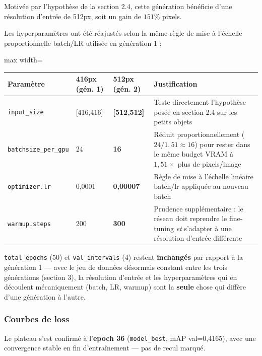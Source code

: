 \documentclass[11pt,a4paper]{article}
\let\Oldsubsubsection\subsubsection
\renewcommand{\subsubsection}{\FloatBarrier\Oldsubsubsection}
\begin{document}
    Motivée par l'hypothèse de la section 2.4, cette génération bénéficie d'une résolution d'entrée de 512px, soit un gain de $151\%$ pixels.
    
    Les hyperparamètres ont été réajustés selon la même règle de mise à
    l'échelle proportionnelle batch/LR utilisée en génération 1 :
    
    \begin{table}[!htbp]
    \centering
    \small
    \begin{adjustbox}{max width=\linewidth}
    \begin{tabular}{@{}p{3.4cm}p{2.2cm}p{2.2cm}p{7.3cm}@{}}
    \toprule
    \textbf{Paramètre} & \textbf{416px (gén. 1)} & \textbf{512px (gén. 2)} & \textbf{Justification} \\
    \midrule
    \texttt{input\_size} & [416,416] & \textbf{[512,512]} & Teste directement l'hypothèse posée en section 2.4 sur les petits objets \\
    \texttt{batchsize\_per\_gpu} & 24 & \textbf{16} & Réduit proportionnellement ($24/1{,}51\approx16$) pour rester dans le même budget VRAM à $1{,}51\times$ plus de pixels/image \\
    \texttt{optimizer.lr} & 0,0001 & \textbf{0,00007} & Règle de mise à l'échelle linéaire batch/lr appliquée au nouveau batch \\
    \texttt{warmup.steps} & 200 & \textbf{300} & Prudence supplémentaire : le réseau doit reprendre le fine-tuning \emph{et} s'adapter à une résolution d'entrée différente \\
    \bottomrule
    \end{tabular}
    \end{adjustbox}
    \end{table}
    
    \texttt{total\_epochs} (50) et \texttt{val\_intervals} (4) restent
    \textbf{inchangés} par rapport à la génération 1 --- avec le jeu de
    données désormais constant entre les trois générations (section 3),
    la résolution d'entrée et les hyperparamètres qui en découlent
    mécaniquement (batch, LR, warmup) sont la \textbf{seule} chose qui
    diffère d'une génération à l'autre.
    
    \subsubsection{Courbes de loss}
    
    Le plateau s'est confirmé à l'\textbf{epoch 36} (\texttt{model\_best},
    mAP val=0,4165), avec une convergence stable en fin d'entraînement ---
    pas de recul marqué.
    
\end{document}
